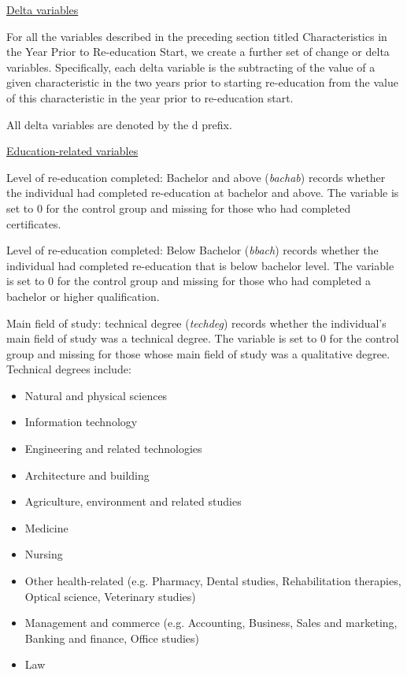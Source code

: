 \documentclass[12pt, a4paper]{article}
\begin{document}
\underline{Delta variables}

For all the variables described in the preceding section titled Characteristics in the Year Prior to Re-education Start, we create a further set of change or delta variables. Specifically, each delta variable is the subtracting of the value of a given characteristic in the two years prior to starting re-education from the value of this characteristic in the year prior to re-education start. 

All delta variables are denoted by the d\textunderscore{} prefix. 

\underline{Education-related variables}

Level of re-education completed: Bachelor and above (\textit{bachab}) records whether the individual had completed re-education at bachelor and above. The variable is set to 0 for the control group and missing for those who had completed certificates. 

Level of re-education completed: Below Bachelor (\textit{bbach}) records whether the individual had completed re-education that is below bachelor level. The variable is set to 0 for the control group and missing for those who had completed a bachelor or higher qualification. 

Main field of study: technical degree (\textit{techdeg}) records whether the individual’s main field of study was a technical degree. The variable is set to 0 for the control group and missing for those whose main field of study was a qualitative degree. Technical degrees include:
\begin{itemize}
  \item Natural and physical sciences
  \item Information technology
  \item Engineering and related technologies
  \item Architecture and building
  \item Agriculture, environment and related studies
  \item Medicine
  \item Nursing
  \item Other health-related (e.g. Pharmacy, Dental studies, Rehabilitation therapies, Optical science, Veterinary studies) 
  \item Management and commerce (e.g. Accounting, Business, Sales and marketing, Banking and finance, Office studies) 
  \item Law
\end{itemize}  
\end{document}
